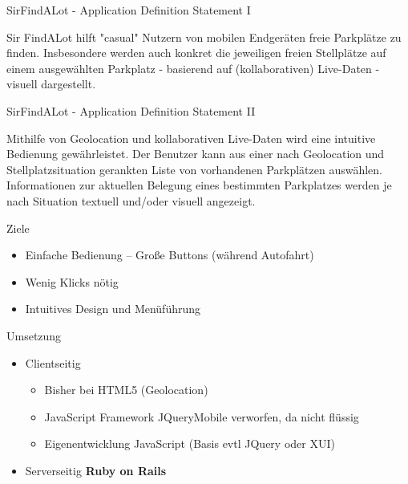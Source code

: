 
\begin{frame}[t,plain]
\titlepage
\end{frame}

\begin{frame}[t]{SirFindALot - Application Definition Statement I}

Sir FindALot hilft "casual" Nutzern von mobilen Endgeräten freie Parkplätze zu finden. 
Insbesondere werden auch konkret die jeweiligen freien Stellplätze auf einem ausgewählten 
Parkplatz - basierend auf (kollaborativen) Live-Daten - visuell dargestellt.

\end{frame}

\begin{frame}[t]{SirFindALot - Application Definition Statement II}

Mithilfe von Geolocation und kollaborativen Live-Daten wird eine intuitive Bedienung 
gewährleistet. Der Benutzer kann aus einer nach Geolocation und Stellplatzsituation gerankten 
Liste von vorhandenen Parkplätzen auswählen. Informationen zur aktuellen Belegung eines 
bestimmten Parkplatzes werden je nach Situation textuell und/oder visuell angezeigt. 

\end{frame}


\begin{frame}[t,fragile]{Ziele}
\begin{itemize}
\item Einfache Bedienung -- Große Buttons (während Autofahrt)
\item Wenig Klicks nötig
\item Intuitives Design und Menüführung
\end{itemize}
\end{frame}

\begin{frame}[t,fragile]{Umsetzung}
\begin{itemize}
	\item Clientseitig
		\begin{itemize}
			\item Bisher bei HTML5 (Geolocation)
			\item JavaScript Framework JQueryMobile verworfen, da nicht flüssig
			\item Eigenentwicklung JavaScript (Basis evtl JQuery oder XUI)
		\end{itemize}
	\item Serverseitig
		\textbf{Ruby on Rails} 
\end{itemize}
\end{frame}

